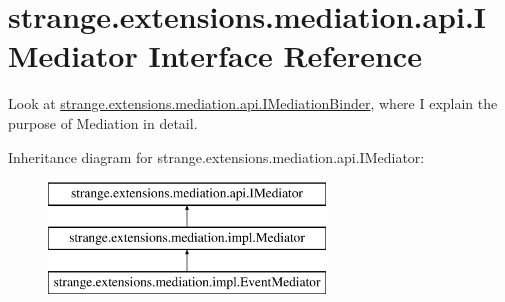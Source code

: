 \hypertarget{interfacestrange_1_1extensions_1_1mediation_1_1api_1_1_i_mediator}{\section{strange.\-extensions.\-mediation.\-api.\-I\-Mediator Interface Reference}
\label{interfacestrange_1_1extensions_1_1mediation_1_1api_1_1_i_mediator}
}


Look at \hyperlink{interfacestrange_1_1extensions_1_1mediation_1_1api_1_1_i_mediation_binder}{strange.\-extensions.\-mediation.\-api.\-I\-Mediation\-Binder}, where I explain the purpose of Mediation in detail.  


Inheritance diagram for strange.\-extensions.\-mediation.\-api.\-I\-Mediator\-:\begin{figure}[H]
\begin{center}
\leavevmode
\includegraphics[height=3.000000cm]{interfacestrange_1_1extensions_1_1mediation_1_1api_1_1_i_mediator}
\end{center}
\end{figure}
